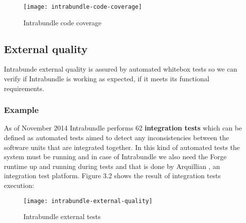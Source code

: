 \begin{figure}[h]
\caption{Intrabundle code coverage}
\texttt{[image: intrabundle-code-coverage]}
\end{figure}

\FloatBarrier

\subsection{External quality}
Intrabunde external quality is assured by automated whitebox tests so we can verify if Intrabundle is working as expected, if it meets its functional requirements.

\subsubsection{Example}
As of November 2014 Intrabundle performs 62 \textbf{integration tests} which can be defined as automated tests aimed to detect any inconsistencies between the software units that are integrated together. In this kind of automated tests the system must be running and in case of Intrabundle we also need the Forge runtime up and running during tests and that is done by Arquillian \citep{dan 2011}, an integration test platform. Figure 3.2 shows the result of integration tests execution:

\begin{figure}[h]
\caption{Intrabundle external tests}
\texttt{[image: intrabundle-external-quality]}
\end{figure}

\FloatBarrier